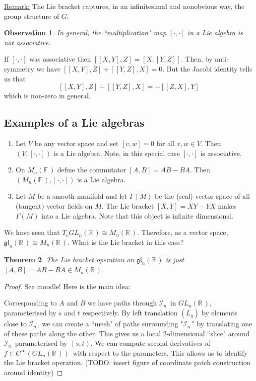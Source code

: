 \documentclass[12pt,a4paper]{article}
\newcommand{\rR}{\ensuremath{\mathbb{R}\,}}
\newcommand{\fF}{\ensuremath{\mathbb{F}\,}}
\newcommand{\cinfn}[1]{\ensuremath{C^{\infty}(#1)\,}}
\newcommand{\cin}{\ensuremath{\mathcal{I}_n\,}}
\newcommand{\ul}[1]{\underline{#1}}
\newtheorem{thm}{Theorem}[subsubsection]
\newtheorem{obs}[thm]{Observation}
\begin{document}
\ul{Remark:} The Lie bracket captures, in an infinitesimal and nonobvious way, the group structure of $G$.

\begin{obs}
In general, the ``multiplication" map $[\cdot ,\cdot]$ in a Lie algebra is not associative.
\end{obs}

If $[\cdot ,\cdot]$ was associative then $[[X, Y], Z] = [X, [Y, Z]]$. Then, by anti-symmetry we have $[[X, Y], Z] + [[Y, Z], X] = 0$. But the Jacobi identity tells us that
\[ [[X, Y], Z] + [[Y, Z], X] = -[[Z, X], Y] \]
which is non-zero in general.

\subsection*{Examples of a Lie algebras}

\begin{enumerate}
\item Let $V$ be any vector space and set $[v, w] = 0$ for all $v, w \in V$. Then $(V, [\cdot, \cdot])$ is a Lie algebra. Note, in this special case $[\cdot, \cdot]$ is associative.

\item On $M_n(\fF)$ define the commutator $[A, B] = AB - BA$. Then $(M_n(\fF), [\cdot, \cdot])$ is a Lie algebra.

\item Let $M$ be a smooth manifold and let $\Gamma (M)$ be the (real) vector space of all (tangent) vector fields on $M$. The Lie bracket $[X, Y] = XY - YX$ makes $\Gamma (M)$ into a Lie algebra. Note that this object is infinite dimensional.
\end{enumerate}

We have seen that $T_eGL_n(\rR) \cong M_n(\rR)$. Therefore, as a vector space, $\mathfrak{gl}_n(\rR) \cong M_n(\rR)$. What is the Lie bracket in this case?

\begin{thm}
The Lie bracket operation on $\mathfrak{gl}_n(\rR)$ is just $[A, B] = AB - BA \in M_n(\rR)$.
\end{thm}

\begin{proof}
See moodle! Here is the main idea:

Corresponding to $A$ and $B$ we have paths through $\cin$ in $GL_n(\rR)$, parameterised by $s$ and $t$ respectively. By left translation $(L_g)$ by elements close to $\cin$, we can create a ``mesh" of paths surrounding "\cin" by translating one of these paths along the other. This gives us a local 2-dimensional ``slice" around $\cin$ parameterised by $(s, t)$. We can compute second derivatives of $f\in \cinfn{GL_n(\rR)}$ with respect to the parameters. This allows us to identify the Lie bracket operation. (TODO: insert figure of coordinate patch construction around identity)
\end{proof}
\end{document}
